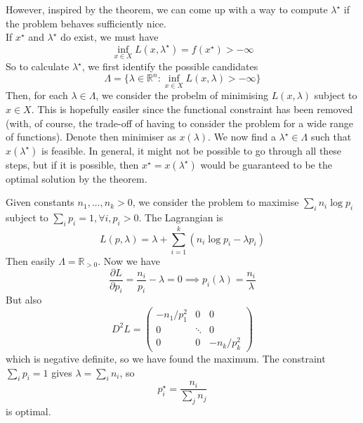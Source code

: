 However, inspired by the theorem, we can come up with a way to compute $\lambda^\star$ if the problem behaves sufficiently nice.\\
If $x^\star$ and $\lambda^\star$ do exist, we must have
$$\inf_{x\in X}L(x,\lambda^\star)=f(x^\star)>-\infty$$
So to calculate $\lambda^\star$, we first identify the possible candidates
$$\Lambda=\{\lambda\in\mathbb R^n:\inf_{x\in X}L(x,\lambda)>-\infty\}$$
Then, for each $\lambda\in\Lambda$, we consider the probelm of minimising $L(x,\lambda)$ subject to $x\in X$.
This is hopefully easiler since the functional constraint has been removed (with, of course, the trade-off of having to consider the problem for a wide range of functions).
Denote then minimiser as $x(\lambda)$.
We now find a $\lambda^\star\in\Lambda$ such that $x(\lambda^\star)$ is feasible.
In general, it might not be possible to go through all these steps, but if it is possible, then $x^\star=x(\lambda^\star)$ would be guaranteed to be the optimal solution by the theorem.
\begin{example}
    Given constants $n_1,\ldots,n_k>0$, we consider the problem to maximise $\sum_in_i\log p_i$ subject to $\sum_ip_i=1,\forall i,p_i>0$.
    The Lagrangian is
    $$L(p,\lambda)=\lambda+\sum_{i=1}^k(n_i\log p_i-\lambda p_i)$$
    Then easily $\Lambda=\mathbb R_{>0}$.
    Now we have
    $$\frac{\partial L}{\partial p_i}=\frac{n_i}{p_i}-\lambda=0\implies p_i(\lambda)=\frac{n_i}{\lambda}$$
    But also
    $$D^2L=\begin{pmatrix}
        -n_1/p_1^2&0&0\\
        0&\ddots&0\\
        0&0&-n_k/p_k^2
    \end{pmatrix}$$
    which is negative definite, so we have found the maximum.
    The constraint $\sum_ip_i=1$ gives $\lambda=\sum_in_i$, so
    $$p_i^\star=\frac{n_i}{\sum_jn_j}$$
    is optimal.
\end{example}
